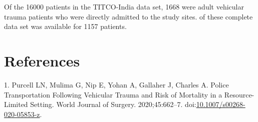 \documentclass[
]{article}
\begin{document}
Of the 16000 patients in the TITCO-India data set, 1668 were adult
vehicular trauma patients who were directly admitted to the study sites.
of these complete data set was available for 1157 patients.

\hypertarget{references}{%
\section*{References}\label{references}}

\hypertarget{refs}{}
\leavevmode\hypertarget{ref-Purcell2020}{}%
1. Purcell LN, Mulima G, Nip E, Yohan A, Gallaher J, Charles A. Police
Transportation Following Vehicular Trauma and Risk of Mortality in a
Resource-Limited Setting. World Journal of Surgery. 2020;45:662--7.
doi:\href{https://doi.org/10.1007/s00268-020-05853-z}{10.1007/s00268-020-05853-z}.
\end{document}

